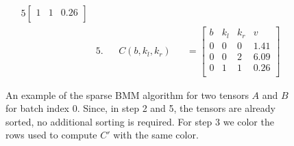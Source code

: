 \begin{figure}[H]
\begin{alignat*}{5}
\begin{bmatrix}
                                                                                                                                                               1   & 1   & 0.26 \\
                                                                                                                                                           \end{bmatrix}
        \\
         & 5.      &                           & C(b, k_l, k_r) &                                                                                      & = \begin{bmatrix}
                                                                                                                                                               b & k_l & k_r & v    \\
                                                                                                                                                               0 & 0   & 0   & 1.41 \\
                                                                                                                                                               0 & 0   & 2   & 6.09 \\
                                                                                                                                                               0 & 1   & 1   & 0.26 \\
                                                                                                                                                           \end{bmatrix}
    \end{alignat*}
    \caption{An example of the sparse BMM algorithm for two tensors $A$ and $B$ for batch index $0$.
        Since, in step 2 and 5, the tensors are already sorted, no additional sorting is required. For step 3
        we color the rows used to compute $C'$ with the same color.}
    \label{fig:bmm:algorithm}
\end{figure}

